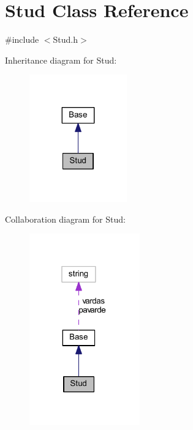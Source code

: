 \hypertarget{class_stud}{}\section{Stud Class Reference}
\label{class_stud}


{\ttfamily \#include $<$Stud.\+h$>$}



Inheritance diagram for Stud\+:
\nopagebreak
\begin{figure}[H]
\begin{center}
\leavevmode
\includegraphics[width=119pt]{class_stud__inherit__graph}
\end{center}
\end{figure}


Collaboration diagram for Stud\+:
\nopagebreak
\begin{figure}[H]
\begin{center}
\leavevmode
\includegraphics[width=135pt]{class_stud__coll__graph}
\end{center}
\end{figure}
